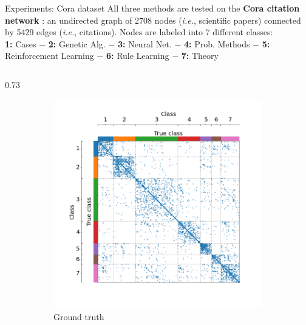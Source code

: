 \documentclass[final]{beamer}
\newlength{\colwidth}
\begin{document}
\begin{frame}[t]
\begin{columns}[t]
\begin{column}{\colwidth}
      \begin{block}{Experiments: Cora dataset}
        All three methods are tested on the \textbf{Cora citation network} \cite{cora}: an undirected graph of 2708 nodes (\textit{i.e.}, scientific papers) connected by 5429 edges (\textit{i.e.}, citations). Nodes are labeled into 7 different classes:\\
        {\small \centering \textbf{1:} Cases $-$ \textbf{2:} Genetic Alg. $-$ \textbf{3:} Neural Net. $-$ \textbf{4:} Prob. Methods $-$ \textbf{5:} Reinforcement Learning $-$ \textbf{6:} Rule Learning $-$ \textbf{7:} Theory}
        \begin{column}{0.73\colwidth}
          \begin{figure}[H]
            \centering
            \hfill
            \begin{subfigure}{0.45\linewidth}
              \centering
              \includegraphics[width=\linewidth, trim={45 25 35 40}, clip]{figures/cora_gt.png}
              \caption{Ground truth
              }
              \label{fig:cora_gt}
            \end{subfigure}
            \hspace{0.5em}
            \begin{subfigure}{0.45\linewidth}
              \centering

\end{subfigure}
\end{figure}
\end{column}
\end{block}
\end{column}
\end{columns}
\end{frame}
\end{document}
